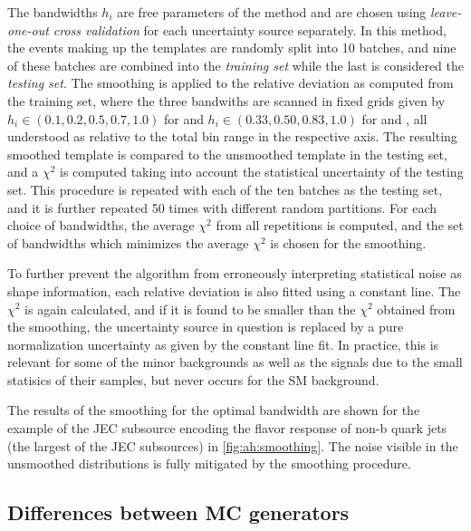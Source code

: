 The bandwidths $h_i$ are free parameters of the method and are chosen using \textit{leave-one-out cross validation} for each uncertainty source separately. In this method, the events making up the templates are randomly split into 10 batches, and nine of these batches are combined into the \textit{training set} while the last is considered the \textit{testing set}. The smoothing is applied to the relative deviation as computed from the training set, where the three bandwiths are scanned in fixed grids given by $h_i \in (0.1, 0.2, 0.5, 0.7, 1.0)$ for \mtt and $h_i \in (0.33, 0.50, 0.83, 1.0)$ for \chel and \chan, all understood as relative to the total bin range in the respective axis. The resulting smoothed template is compared to the unsmoothed template in the testing set, and a $\chi^2$ is computed taking into account the statistical uncertainty of the testing set. This procedure is repeated with each of the ten batches as the testing set, and it is further repeated 50 times with different random partitions. For each choice of bandwidths, the average $\chi^2$ from all repetitions is computed, and the set of bandwidths which minimizes the average $\chi^2$ is chosen for the smoothing.

To further prevent the algorithm from erroneously interpreting statistical noise as shape information, each relative deviation is also fitted using a constant line. The $\chi^2$ is again calculated, and if it is found to be smaller than the $\chi^2$ obtained from the smoothing, the uncertainty source in question is replaced by a pure normalization uncertainty as given by the constant line fit. In practice, this is relevant for some of the minor backgrounds as well as the signals due to the small statisics of their samples, but never occurs for the SM \ttbar background.

The results of the smoothing for the optimal bandwidth are shown for the example of the JEC subsource encoding the flavor response of non-b quark jets (the largest of the JEC subsources) in \cref{fig:ah:smoothing}. The noise visible in the unsmoothed distributions is fully mitigated by the smoothing procedure.



\subsection{Differences between MC generators}
\label{sec:ah:gennps}

